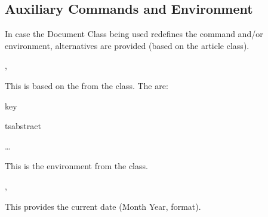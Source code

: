 \documentclass{article}
\begin{document}
\subsection{Auxiliary Commands and Environment}
In case the Document Class being used redefines the \tsobj[code]{\maketitle} command and/or  environment, alternatives are provided (based on the article class).

\begin{codedescribe}[code]{\typesettitle,\tstitle}
\begin{codesyntax}
\end{codesyntax}
This is based on the \tsobj[code]{\maketitle} from the  class. The  are:
\end{codedescribe}

\begin{describelist*}{key}
\end{describelist*}

\begin{codedescribe}[env]{tsabstract}
\begin{codesyntax}
\tsmacro{\begin{tsabstract}}{}
\ldots
\tsmacro{\end{tsabstract}}{}
\end{codesyntax}
This is the  environment from the  class.
\end{codedescribe}

\begin{codedescribe}[code,new=2023/05/16]{\typesetdate,\tsdate}
\begin{codesyntax}
\tsmacro{\typesetdate}{}
\tsmacro{\tsdate}{}
\end{codesyntax}
This provides the current date (Month Year, format).
\end{codedescribe}

\printbibliography
\end{document}
